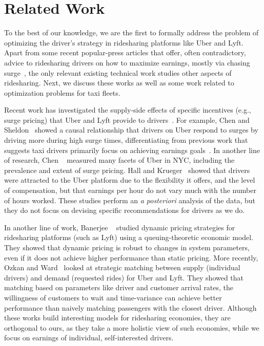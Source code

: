 
\section{Related Work}
\label{sec:related_work}

To the best of our knowledge, we are the first to formally address the problem of optimizing
the driver's strategy in ridesharing platforms like Uber and Lyft. 
Apart from 
some recent popular-press articles that 
offer, often contradictory, advice to ridesharing drivers on how to maximize earnings, mostly via chasing surge~\cite{dont,tips}, 
the only relevant existing technical work 
studies other aspects of ridesharing. 
Next, we discuss these works as well as some work related to optimization problems
for taxi fleets.


Recent work has investigated the supply-side effects of specific incentives (e.g., surge pricing) that Uber and Lyft provide to drivers~\cite{slaves}.  For example, Chen and Sheldon~\cite{chen2016dynamic} showed a causal relationship that drivers on Uber respond to surges by driving more during high surge times,  differentiating from previous work that suggests taxi drivers primarily focus on achieving earnings goals~\cite{camerer1997labor}. 
In another line of research,
Chen {\etal}~\cite{chen2015peeking} measured many facets of Uber in NYC, including the prevalence and extent 
  of surge pricing.
Hall and Krueger~\cite{hall2016analysis} showed that drivers were attracted to the Uber platform due to the flexibility it offers, 
and the level of compensation, but that earnings per hour do not vary much with the number of hours worked. 
These studies perform an {\em a posteriori} analysis of the data,
but they do not focus on devising specific recommendations for drivers as we do.


 In another line of work, Banerjee {\etal}~\cite{banerjee2015pricing} studied  
 dynamic
pricing strategies for ridesharing platforms (such as Lyft) using a 
queuing-theoretic economic model. 
They showed that dynamic pricing is robust to changes in system parameters, even if it does not 
  achieve higher performance than static pricing.  
More recently, Ozkan and Ward~\cite{ozkan2016dynamic} looked at strategic matching between supply (individual drivers) 
  and demand (requested rides) for Uber and Lyft.
They showed that matching based on parameters like driver and customer arrival rates,  the willingness of customers to wait and time-variance can achieve better performance than naively matching 
passengers with the closest driver. 
Although these works build interesting models for ridesharing economies, they are
orthogonal to ours, as they take a more holistic view of such economies, while we focus 
 on earnings of individual, self-interested drivers.




